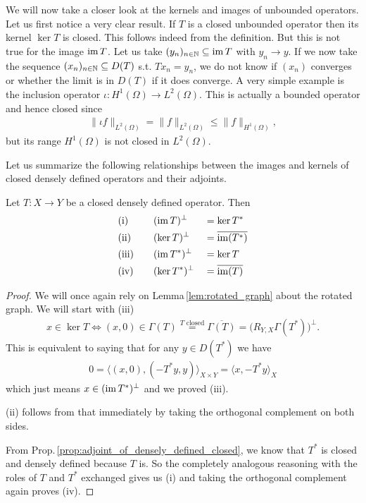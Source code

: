 \documentclass[../master_thesis.tex]{subfiles}
\begin{document}
We will now take a closer look at the kernels and images of unbounded operators.
Let us first notice a very clear result. If $T$ is a closed unbounded operator 
then its kernel $\ker T$ is closed. This follows indeed from the definition. 
But this is not true for the image $\operatorname{im} T$. Let us take
$(y_n)_{n \in \mathbb{N}} \subseteq \operatorname{im} T$ with $y_n \rightarrow y$.
If we now take the sequence $(x_n)_{n \in \mathbb{N}} \subseteq D(T)$
s.t. $Tx_n = y_n$, we do not know if $(x_n)$ converges or 
whether the limit is in $D(T)$ if it does converge. 
A very simple example is the inclusion operator
$\iota: H^1(\Omega) \rightarrow L^2(\Omega)$. This is actually a bounded 
operator and hence closed since 
\begin{align*}
    \lVert \iota f \rVert _{L^2(\Omega)} 
    = \lVert f \rVert _{L^2(\Omega)} 
    \leq \lVert f \rVert _{H^1(\Omega)},
\end{align*}
but its range $H^1(\Omega)$ is not closed in $L^2(\Omega)$.

Let us summarize the following relationships between the images and kernels 
of closed densely defined operators and their adjoints.

\begin{proposition}\label{prop:kernel_image_adjoint}
    Let $T: X \rightarrow Y$ be a closed densely defined operator. Then
    \begin{alignat*}{3}
        &\text{\normalfont{(i)}} \quad&&(\operatorname{im} T)^\perp &&= \ker T^*
        \\ &\text{\normalfont{(ii)}} \quad&&(\ker T)^\perp &&= \overline{\operatorname{im}(T^*)}
        \\ &\text{\normalfont{(iii)}} \quad&&(\operatorname{im} T^*)^\perp &&= \ker T
        \\ &\text{\normalfont{(iv)}} \quad&&(\ker T^*)^\perp &&= \overline{\operatorname{im}(T)}
    \end{alignat*}
\end{proposition}
\begin{proof}
    We will once again rely on Lemma\,\ref{lem:rotated_graph} about the 
    rotated graph. We will start with (iii)
    \begin{align*}
        x \in \ker T \Leftrightarrow (x,0) \in \Gamma(T) 
        \stackrel{\text{$T$ closed}}{=} \overline{\Gamma(T)} 
        = \big( R_{Y,X}\Gamma(T^*) \big)^\perp .
    \end{align*}
    This is equivalent to saying that for any $y \in D(T^*)$ 
    we have 
    \begin{align*}
        0 = \langle (x,0), (-T^*y,y) \rangle_{X \times Y}
        = \langle x, -T^*y \rangle_X
    \end{align*}
    which just means $x \in (\operatorname{im} T^*)^\perp$ and we proved (iii).

    (ii) follows from that immediately by taking the orthogonal complement 
    on both sides.

    From Prop.\,\ref{prop:adjoint_of_densely_defined_closed}, 
    we know that $T^*$ is closed and densely defined because $T$
    is. So the completely analogous reasoning with the roles of $T$ and $T^*$
    exchanged gives us (i) and taking the orthogonal complement again 
    proves (iv).
\end{proof}
\end{document}

